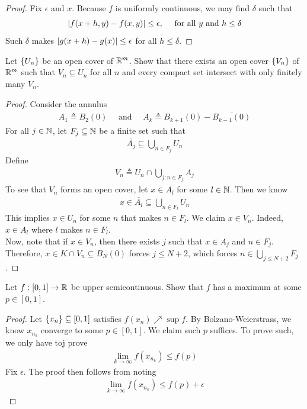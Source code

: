 \documentclass{report}
\begin{document}
\begin{proof}
Fix $\epsilon $ and $x$. Because  $f$ is uniformly continuous, we may find $\delta$ such that 
\begin{align*}
\left|f(x+h,y)-f(x,y)\right|\leq \epsilon,\quad \text{ for all }y \text{ and } h \leq \delta
\end{align*}
Such $\delta$ makes $\left|g(x+h)-g(x)\right|\leq \epsilon $ for all $h\leq \delta$. 
\end{proof}
\begin{question}{}{}
Let $\left\{ U_n \right\}$ be an open cover of $\mathbb{R}^m$. Show that there exists an open cover $\left\{ V_n \right\}$ of $\mathbb{R}^m$ such that  $V_n \subseteq U_n$ for all $n$ and every compact set intersect with only finitely many  $V_n$. 
\end{question}
\begin{proof}
Consider the annulus 
\begin{align*}
A_1 \triangleq  B_2(0)\quad \text{ and }\quad A_k \triangleq B_{k+1}(0) - \overline{B_{k-1}(0)}
\end{align*}
For all $j\in\mathbb{N}$, let $F_j \subseteq \mathbb{N}$ be a finite set such that 
\begin{align*}
\overline{A_j} \subseteq \bigcup_{n \in F_j}U_n
\end{align*}
Define 
\begin{align*}
V_n \triangleq U_n \cap  \bigcup_{j: n \in F_j} A_j
\end{align*}
To see that $V_n$ forms an open cover, let  $x \in A_l$ for some $l \in\mathbb{N}$. Then we know 
\begin{align*}
x\in \overline{A_l} \subseteq \bigcup_{n \in F_l}U_n
\end{align*}
This implies $x \in U_n$ for some $n$ that makes  $n \in F_l$. We claim $x \in V_n$. Indeed, $x \in A_l$ where $l$ makes  $n\in F_l$.\\

Now, note that if $x \in V_n$, then there exists $j$ such that  $x \in A_j$ and $n \in F_j$. Therefore, $x\in K \cap V_n\subseteq B_N(0)$ forces $j\leq N+2$, which forces $n \in \bigcup_{j\leq N+2} F_j$. 
\end{proof}
\begin{question}{}{}
Let $f:[0,1]\rightarrow \mathbb{R}$ be upper semicontinuous. Show that $f$ has a maximum at some $p \in [0,1]$. 
\end{question}
\begin{proof}
Let $\left\{ x_n \right\}\subseteq [0,1]$ satisfies  $f(x_n)\nearrow \sup f$. By Bolzano-Weierstrass, we know $x_{n_k}$ converge to some $p \in [0,1]$. We claim such $p$ suffices.  To prove such, we only have toj prove 
\begin{align*}
\lim_{k\to \infty} f(x_{n_k})\leq f(p) 
\end{align*}
Fix $\epsilon $. The proof then follows from noting 
\begin{align*}
\lim_{k\to \infty} f(x_{n_k})\leq f(p)+ \epsilon   
\end{align*}
\end{proof}
\end{document}
